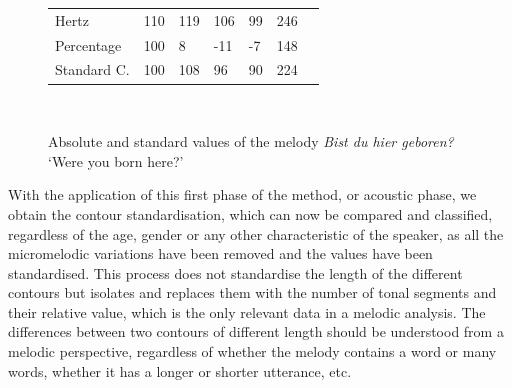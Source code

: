 \documentclass[output=paper]{langscibook}
\begin{document}
\begin{figure}
\begin{tabular}{lR{1cm}R{1cm}R{.7cm}R{1.2cm}R{1.1cm}p{3mm}}
  \midrule
 Hertz       & 110 & 119 & 106 & 99 & 246  &\\
 Percentage  & 100 & 8 & -11 & -7 & 148 \\ 
 Standard C. & 100 & 108 & 96 & 90 & 224\\
\end{tabular}~~~~~

 
\caption{Absolute and standard values of the melody \textit{Bist du hier geboren?} ‘Were you born here?’  \label{graph:font:2}}
\end{figure}

With the application of this first phase of the method, or acoustic phase, we obtain the contour standardisation, which can now be compared and classified, regardless of the age, gender or any other characteristic of the speaker, as all the micromelodic variations have been removed and the values have been standardised. This process does not standardise the length of the different contours but isolates and replaces them with the number of tonal segments and their relative value, which is the only relevant data in a melodic analysis. The differences between two contours of different length should be understood from a melodic perspective, regardless of whether the melody contains a word or many words, whether it has a longer or shorter utterance, etc.
\end{document}
